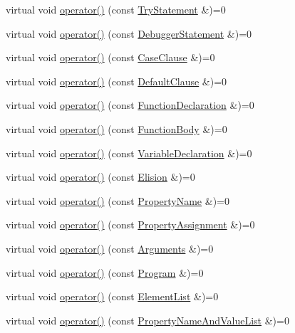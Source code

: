 \begin{DoxyCompactItemize}
\item 
virtual void \hyperlink{struct_visitor_af65bd8aa26745dea293f06d553d4f46f}{operator()} (const \hyperlink{struct_try_statement}{Try\+Statement} \&)=0
\item 
virtual void \hyperlink{struct_visitor_a7e091bee5a2d416aef22f9b1abd8c7ee}{operator()} (const \hyperlink{struct_debugger_statement}{Debugger\+Statement} \&)=0
\item 
virtual void \hyperlink{struct_visitor_acf85f394ddde782f9c08103055716d53}{operator()} (const \hyperlink{struct_case_clause}{Case\+Clause} \&)=0
\item 
virtual void \hyperlink{struct_visitor_adf82a6bdb4aad978d8ac6a3878a0d400}{operator()} (const \hyperlink{struct_default_clause}{Default\+Clause} \&)=0
\item 
virtual void \hyperlink{struct_visitor_aa4450ebee6fecf69499279c0768282f1}{operator()} (const \hyperlink{struct_function_declaration}{Function\+Declaration} \&)=0
\item 
virtual void \hyperlink{struct_visitor_a72bb7e5f0b3bd7ebc8e30f5903a5c5f2}{operator()} (const \hyperlink{struct_function_body}{Function\+Body} \&)=0
\item 
virtual void \hyperlink{struct_visitor_a31c2d34895501d90193ec523c8acde05}{operator()} (const \hyperlink{struct_variable_declaration}{Variable\+Declaration} \&)=0
\item 
virtual void \hyperlink{struct_visitor_a87450ddc80e1522e8ef06cc7c168bad4}{operator()} (const \hyperlink{struct_elision}{Elision} \&)=0
\item 
virtual void \hyperlink{struct_visitor_a51d8b1d3dafa5d6a7d878673a2c4f9a8}{operator()} (const \hyperlink{struct_property_name}{Property\+Name} \&)=0
\item 
virtual void \hyperlink{struct_visitor_a698c9aa4b47188061f156fe58c148d55}{operator()} (const \hyperlink{struct_property_assignment}{Property\+Assignment} \&)=0
\item 
virtual void \hyperlink{struct_visitor_a73daac2b555cca03beaf9da73bf540c7}{operator()} (const \hyperlink{struct_arguments}{Arguments} \&)=0
\item 
virtual void \hyperlink{struct_visitor_a768e64f6e6fffb7440e3c1f1a78d9481}{operator()} (const \hyperlink{struct_program}{Program} \&)=0
\item 
virtual void \hyperlink{struct_visitor_a339d238c4c4b3c356878817481b398be}{operator()} (const \hyperlink{struct_element_list}{Element\+List} \&)=0
\item 
virtual void \hyperlink{struct_visitor_a91666efb64ff75272e244610bea83717}{operator()} (const \hyperlink{struct_property_name_and_value_list}{Property\+Name\+And\+Value\+List} \&)=0

\end{DoxyCompactItemize}
